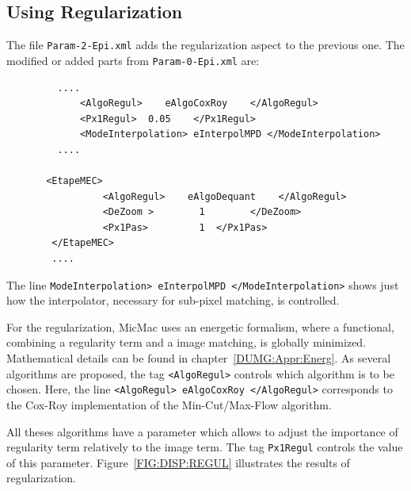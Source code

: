 \subsection{Using Regularization}

The file {\tt Param-2-Epi.xml} adds the regularization aspect
to the previous one. The modified or added  parts from
{\tt Param-0-Epi.xml} are:

{\scriptsize
\begin{verbatim}
         ....
             <AlgoRegul>    eAlgoCoxRoy    </AlgoRegul>
             <Px1Regul>  0.05    </Px1Regul>
             <ModeInterpolation> eInterpolMPD </ModeInterpolation>
         ....

       <EtapeMEC>
                 <AlgoRegul>    eAlgoDequant    </AlgoRegul>
                 <DeZoom >        1        </DeZoom>
                 <Px1Pas>         1  </Px1Pas>
        </EtapeMEC>
        ....

\end{verbatim}
}

The line {\tt ModeInterpolation> eInterpolMPD </ModeInterpolation>} shows
just how the interpolator, necessary for sub-pixel matching, is controlled.


For the regularization, MicMac uses an energetic formalism, where a
functional, combining a regularity term and a image matching,
is globally minimized. Mathematical details can be found in
chapter~\ref{DUMG:Appr:Energ}. As several algorithms
are proposed, the tag  {\tt<AlgoRegul>} controls which
algorithm is to be chosen.  Here, the line
{\tt<AlgoRegul>    eAlgoCoxRoy    </AlgoRegul>}  corresponds to
the Cox-Roy implementation of the Min-Cut/Max-Flow algorithm.

All theses algorithms have a parameter which allows to adjust
the importance of regularity term relatively to the image term.
The tag {\tt Px1Regul} controls the value of this
parameter. Figure~\ref{FIG:DISP:REGUL} illustrates the results
of regularization.


